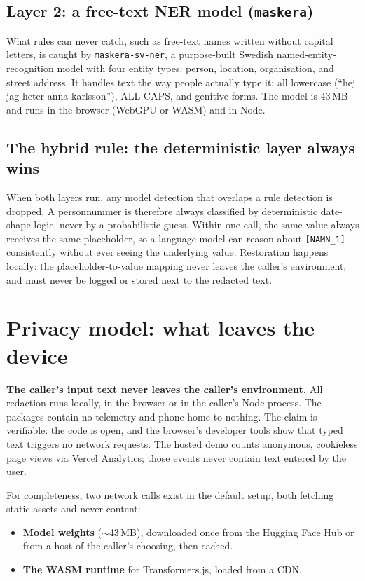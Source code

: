 \documentclass[10pt,a4paper]{article}
\newcommand{\pkg}[1]{\texttt{#1}}
\begin{document}
\subsection{Layer 2: a free-text NER model (\pkg{maskera})}

What rules can never catch, such as free-text names written without capital
letters, is caught by \pkg{maskera-sv-ner}, a purpose-built Swedish
named-entity-recognition model with four entity types: person, location,
organisation, and street address. It handles text the way people actually
type it: all lowercase (``hej jag heter anna karlsson''), ALL CAPS, and
genitive forms. The model is 43\,MB and runs in the browser (WebGPU or WASM)
and in Node.

\subsection{The hybrid rule: the deterministic layer always wins}

When both layers run, any model detection that overlaps a rule detection is
dropped. A personnummer is therefore always classified by deterministic
date-shape logic, never by a probabilistic guess. Within one call, the same value always
receives the same placeholder, so a language model can reason about
\texttt{[NAMN\_1]} consistently without ever seeing the underlying value.
Restoration happens locally: the placeholder-to-value mapping never leaves
the caller's environment, and must never be logged or stored next to the
redacted text.

\section{Privacy model: what leaves the device}

\textbf{The caller's input text never leaves the caller's environment.} All
redaction runs
locally, in the browser or in the caller's Node process. The packages contain
no telemetry and phone home to nothing. The claim is verifiable: the code is
open, and the browser's developer tools show that typed text triggers no
network requests. The hosted demo counts anonymous, cookieless page views via
Vercel Analytics; those events never contain text entered by the user.

For completeness, two network calls exist in the default setup, both fetching
static assets and never content:

\begin{itemize}
  \item \textbf{Model weights} ($\sim$43\,MB), downloaded once from the
        Hugging Face Hub or from a host of the caller's choosing, then cached.
  \item \textbf{The WASM runtime} for Transformers.js, loaded from a CDN.
\end{itemize}
\end{document}
